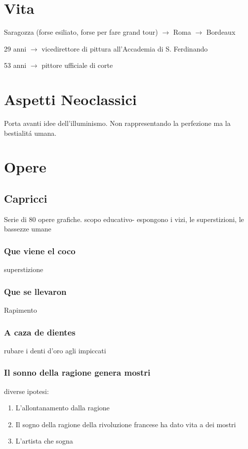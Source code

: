 \documentclass{article}
\title{\jobname}
\author{Eugenio Animali}
\begin{document}
\maketitle
\section{Vita}
Saragozza (forse esiliato, forse per fare grand tour) $\to$ Roma $\to$ Bordeaux

29 anni $\to$ vicedirettore di pittura all'Accademia di S. Ferdinando

53 anni $\to$ pittore ufficiale di corte

\section{Aspetti Neoclassici}
Porta avanti idee dell'illuminismo. Non rappresentando la perfezione ma la bestialitá umana.

\section{Opere}

\subsection{Capricci}
Serie di 80 opere grafiche.
scopo educativo- espongono i vizi, le superstizioni, le bassezze umane

\subsubsection{Que viene el coco}
superstizione

\subsubsection{Que se llevaron}
Rapimento

\subsubsection{A caza de dientes}
rubare i denti d'oro agli impiccati

\subsubsection{Il sonno della ragione genera mostri}
diverse ipotesi:
\begin{enumerate}
    \item L'allontanamento dalla ragione
    \item Il sogno della ragione della rivoluzione francese ha dato vita a dei mostri
    \item L'artista che sogna
\end{enumerate}
\end{document}
